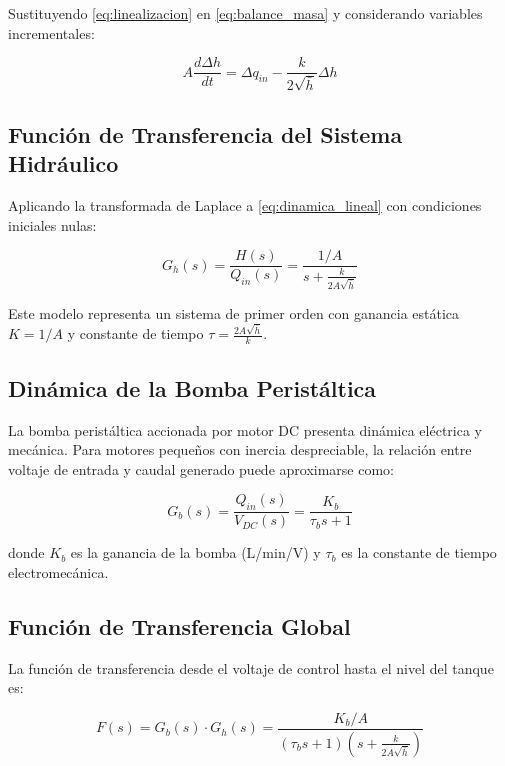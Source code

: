 \documentclass[conference]{IEEEtran}
\begin{document}
Sustituyendo \eqref{eq:linealizacion} en \eqref{eq:balance_masa} y considerando variables incrementales:

\begin{equation}
A\frac{d\Delta h}{dt} = \Delta q_{in} - \frac{k}{2\sqrt{\bar{h}}}\Delta h
\label{eq:dinamica_lineal}
\end{equation}

\subsection{Función de Transferencia del Sistema Hidráulico}

Aplicando la transformada de Laplace a \eqref{eq:dinamica_lineal} con condiciones iniciales nulas:

\begin{equation}
G_h(s) = \frac{H(s)}{Q_{in}(s)} = \frac{1/A}{s + \frac{k}{2A\sqrt{\bar{h}}}}
\label{eq:tf_tanque}
\end{equation}

Este modelo representa un sistema de primer orden con ganancia estática $K = 1/A$ y constante de tiempo $\tau = \frac{2A\sqrt{\bar{h}}}{k}$.

\subsection{Dinámica de la Bomba Peristáltica}

La bomba peristáltica accionada por motor DC presenta dinámica eléctrica y mecánica. Para motores pequeños con inercia despreciable, la relación entre voltaje de entrada y caudal generado puede aproximarse como:

\begin{equation}
G_b(s) = \frac{Q_{in}(s)}{V_{DC}(s)} = \frac{K_b}{\tau_b s + 1}
\label{eq:tf_bomba}
\end{equation}

donde $K_b$ es la ganancia de la bomba (L/min/V) y $\tau_b$ es la constante de tiempo electromecánica.

\subsection{Función de Transferencia Global}

La función de transferencia desde el voltaje de control hasta el nivel del tanque es:

\begin{equation}
F(s) = G_b(s) \cdot G_h(s) = \frac{K_b/A}{(\tau_b s + 1)\left(s + \frac{k}{2A\sqrt{\bar{h}}}\right)}
\label{eq:tf_global}
\end{equation}
\end{document}
